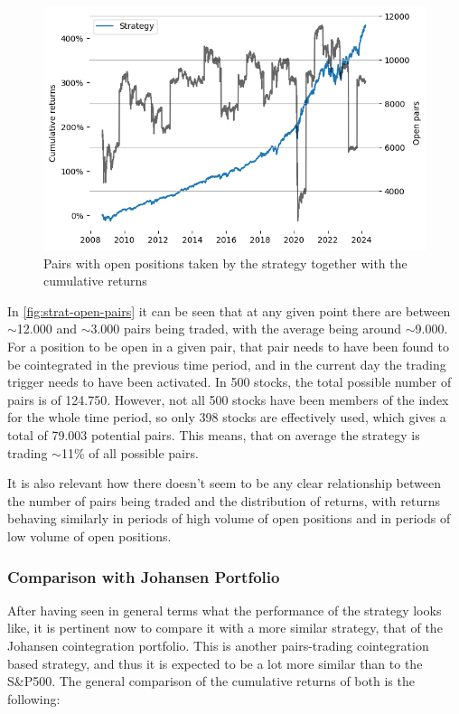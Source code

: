 \begin{figure}[ht]
    \captionsetup{justification=centering}
    \includegraphics[width=\linewidth]{assets/strat-open-pairs.png}
    \caption{Pairs with open positions taken by the strategy together with the cumulative returns}
    \label{fig:strat-open-pairs}
\end{figure}

In \autoref{fig:strat-open-pairs} it can be seen that at any given point there are between $\sim$12.000 and $\sim$3.000 pairs being traded, with the average being around $\sim$9.000. For a position to be open in a given pair, that pair needs to have been found to be cointegrated in the previous time period, and in the current day the trading trigger needs to have been activated. In 500 stocks, the total possible number of pairs is of 124.750. However, not all 500 stocks have been members of the index for the whole time period, so only 398 stocks are effectively used, which gives a total of 79.003 potential pairs. This means, that on average the strategy is trading $\sim$11\% of all possible pairs. 

It is also relevant how there doesn't seem to be any clear relationship between the number of pairs being traded and the distribution of returns, with returns behaving similarly in periods of high volume of open positions and in periods of low volume of open positions. 

\subsubsection{Comparison with Johansen Portfolio}
After having seen in general terms what the performance of the strategy looks like, it is pertinent now to compare it with a more similar strategy, that of the Johansen cointegration portfolio. This is another pairs-trading cointegration based strategy, and thus it is expected to be a lot more similar than to the S\&P500. The general comparison of the cumulative returns of both is the following:

